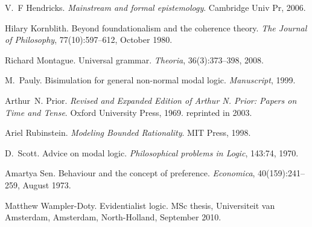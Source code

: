 \documentclass{acmconf}
\newcommand{\tmtextit}[1]{{\itshape{#1}}}
\begin{document}
\begin{thebibliography}{10}
  V.~F Hendricks.
  {\newblock}\tmtextit{Mainstream and formal epistemology}.
  {\newblock}Cambridge Univ Pr, 2006.
  
  Hilary Kornblith. {\newblock}Beyond
  foundationalism and the coherence theory. {\newblock}\tmtextit{The Journal
  of Philosophy}, 77(10):597--612, October 1980.
  
  Richard Montague.
  {\newblock}Universal grammar. {\newblock}\tmtextit{Theoria}, 36(3):373--398,
  2008.
  
  M.~Pauly. {\newblock}Bisimulation for
  general non-normal modal logic. {\newblock}\tmtextit{Manuscript}, 1999.
  
  Arthur~N. Prior.
  {\newblock}\tmtextit{Revised and Expanded Edition of Arthur N. Prior: Papers
  on Time and Tense}. {\newblock}Oxford University Press, 1969.
  {\newblock}reprinted in 2003.
  
  Ariel Rubinstein.
  {\newblock}\tmtextit{Modeling Bounded Rationality}. {\newblock}MIT Press,
  1998.
  
  D.~Scott. {\newblock}Advice on modal logic.
  {\newblock}\tmtextit{Philosophical problems in Logic}, 143:74, 1970.
  
  Amartya Sen. {\newblock}Behaviour and the
  concept of preference. {\newblock}\tmtextit{Economica}, 40(159):241--259,
  August 1973.
  
  Matthew Wampler-Doty.
  {\newblock}Evidentialist logic. {\newblock}MSc thesis, Universiteit van
  Amsterdam, Amsterdam, North-Holland, September 2010.
\end{thebibliography}
\end{document}
